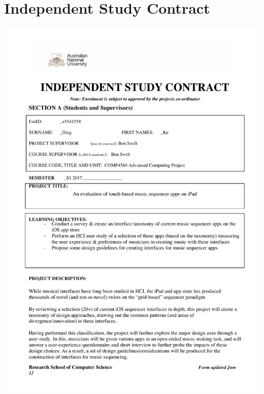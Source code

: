 \chapter{Independent Study Contract}

\vspace{-1.8cm}
\includegraphics[width=\textwidth]{images/IndependentStudyContract1}
\newpage


